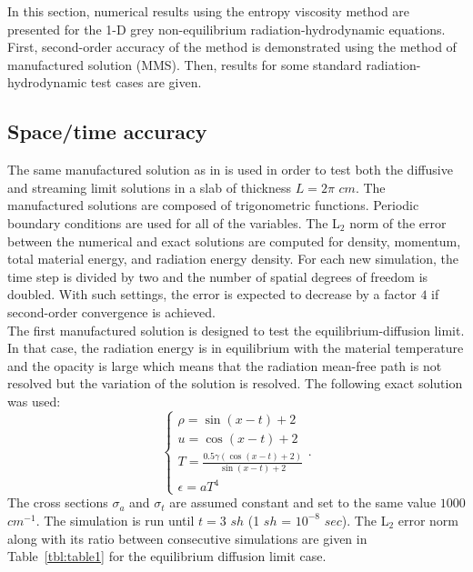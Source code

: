 \documentclass[review]{elsarticle}
\newcommand{\tbl}[1]{Table~\ref{#1}}                     %
\begin{document}
In this section, numerical results using the entropy viscosity method are presented for the 1-D grey non-equilibrium radiation-hydrodynamic equations. First, second-order accuracy of the method is demonstrated using the method of manufactured solution (MMS). Then, results for some standard radiation-hydrodynamic test cases are given. 

\subsection{Space/time accuracy}
\label{sec:MMS}

The same manufactured solution as in \cite{EdwardsMorelLowrie} is used in order to test both the diffusive and streaming limit solutions in a slab of thickness $L=2 \pi$ $cm$. The manufactured solutions are composed of trigonometric functions. Periodic boundary conditions are used for all of the variables. The L$_2$ norm of the error between the numerical and exact solutions are computed for density, momentum, total material energy, and radiation energy density. For each new simulation, the time step is divided by two and the  number of spatial degrees of freedom is doubled. With such settings, the error is expected to decrease by a factor $4$ if second-order convergence is achieved. \\
The first manufactured solution is designed to test the equilibrium-diffusion limit. In that case, the radiation energy is in equilibrium with the material temperature and the opacity is large which means that the radiation mean-free path is not resolved but the variation of the solution is resolved. The following exact solution was used:
\begin{equation}
\label{eq:equation13}
\left\{
\begin{array}{llll}
\rho = \sin (x-t)+2 \\
u = \cos(x-t) +2 \\
T = \frac{0.5 \gamma (\cos(x-t) +2) }{\sin (x-t)+2}\\
\epsilon = a T^4
\end{array}
\right. .
\end{equation}
The cross sections $\sigma_a$ and $\sigma_t$ are assumed constant and set to the same value $1000$ $cm^{-1}$. The simulation is run until $t=3$ $sh$
(1 $sh$ = $10^{-8}$ $sec$). The L$_2$ error norm along with its ratio between consecutive simulations are given in \tbl{tbl:table1} for the equilibrium diffusion limit case.
\end{document}
